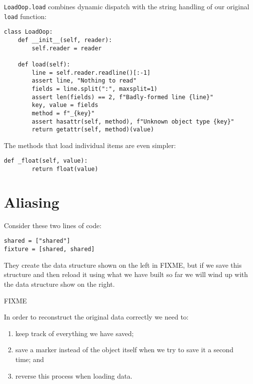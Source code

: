 \documentclass{scrbook}
\begin{document}
\texttt{LoadOop.load} combines dynamic dispatch with
the string handling of our original \texttt{load} function:


\begin{lstlisting}[frame=single,frameround=tttt]
class LoadOop:
    def __init__(self, reader):
        self.reader = reader

    def load(self):
        line = self.reader.readline()[:-1]
        assert line, "Nothing to read"
        fields = line.split(":", maxsplit=1)
        assert len(fields) == 2, f"Badly-formed line {line}"
        key, value = fields
        method = f"_{key}"
        assert hasattr(self, method), f"Unknown object type {key}"
        return getattr(self, method)(value)
\end{lstlisting}



The methods that load individual items are even simpler:


\begin{lstlisting}[frame=single,frameround=tttt]
    def _float(self, value):
        return float(value)
\end{lstlisting}


\section{Aliasing}\label{persistence-aliasing}


Consider these two lines of code:

\begin{lstlisting}[frame=single,frameround=tttt]
shared = ["shared"]
fixture = [shared, shared]
\end{lstlisting}


\noindent They create the data structure shown on the left in FIXME,
but if we save this structure and then reload it
using what we have built so far
we will wind up with the data structure show on the right.


FIXME


In order to reconstruct the original data correctly we need to:

\begin{enumerate}

\item 

keep track of everything we have saved;



\item 

save a marker instead of the object itself
    when we try to save it a second time;
    and



\item 

reverse this process when loading data.



\end{enumerate}
\end{document}
